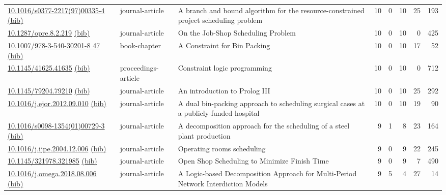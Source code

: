 {\begin{longtable}{p{5cm}lp{11cm}rrrrr}
\href{http://dx.doi.org/10.1016/s0377-2217(97)00335-4}{10.1016/s0377-2217(97)00335-4} \href{https://www.doi2bib.org/bib/10.1016/s0377-2217(97)00335-4}{(bib)} & journal-article & A branch and bound algorithm for the resource-constrained project scheduling problem & 10 & 0 & 10 & 25 & 193 \\
\href{http://dx.doi.org/10.1287/opre.8.2.219}{10.1287/opre.8.2.219} \href{https://www.doi2bib.org/bib/10.1287/opre.8.2.219}{(bib)} & journal-article & On the Job-Shop Scheduling Problem & 10 & 0 & 10 & 0 & 425 \\
\href{http://dx.doi.org/10.1007/978-3-540-30201-8_47}{10.1007/978-3-540-30201-8 47} \href{https://www.doi2bib.org/bib/10.1007/978-3-540-30201-8_47}{(bib)} & book-chapter & A Constraint for Bin Packing & 10 & 0 & 10 & 17 & 52 \\
\href{http://dx.doi.org/10.1145/41625.41635}{10.1145/41625.41635} \href{https://www.doi2bib.org/bib/10.1145/41625.41635}{(bib)} & proceedings-article & Constraint logic programming & 10 & 0 & 10 & 0 & 712 \\
\href{http://dx.doi.org/10.1145/79204.79210}{10.1145/79204.79210} \href{https://www.doi2bib.org/bib/10.1145/79204.79210}{(bib)} & journal-article & An introduction to Prolog III & 10 & 0 & 10 & 25 & 292 \\
\href{http://dx.doi.org/10.1016/j.ejor.2012.09.010}{10.1016/j.ejor.2012.09.010} \href{https://www.doi2bib.org/bib/10.1016/j.ejor.2012.09.010}{(bib)} & journal-article & A dual bin-packing approach to scheduling surgical cases at a publicly-funded hospital & 10 & 0 & 10 & 19 & 90 \\
\href{http://dx.doi.org/10.1016/s0098-1354(01)00729-3}{10.1016/s0098-1354(01)00729-3} \href{https://www.doi2bib.org/bib/10.1016/s0098-1354(01)00729-3}{(bib)} & journal-article & A decomposition approach for the scheduling of a steel plant production & 9 & 1 & 8 & 23 & 164 \\
\href{http://dx.doi.org/10.1016/j.ijpe.2004.12.006}{10.1016/j.ijpe.2004.12.006} \href{https://www.doi2bib.org/bib/10.1016/j.ijpe.2004.12.006}{(bib)} & journal-article & Operating rooms scheduling & 9 & 0 & 9 & 22 & 245 \\
\href{http://dx.doi.org/10.1145/321978.321985}{10.1145/321978.321985} \href{https://www.doi2bib.org/bib/10.1145/321978.321985}{(bib)} & journal-article & Open Shop Scheduling to Minimize Finish Time & 9 & 0 & 9 & 7 & 490 \\
\href{http://dx.doi.org/10.1016/j.omega.2018.08.006}{10.1016/j.omega.2018.08.006} \href{https://www.doi2bib.org/bib/10.1016/j.omega.2018.08.006}{(bib)} & journal-article & A Logic-based Decomposition Approach for Multi-Period Network Interdiction Models & 9 & 5 & 4 & 27 & 14 \\

\end{longtable}}
